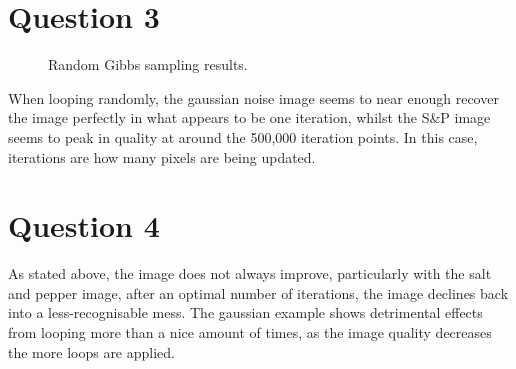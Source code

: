 \documentclass[]{article}
\begin{document}
    \section*{Question 3}
        \begin{figure}[h]
            \centering
            \caption{Random Gibbs sampling results.}
            \label{fig:q3}
        \end{figure}
        \par
        When looping randomly, the gaussian noise image seems to near enough recover the image perfectly
        in what appears to be one iteration, whilst the S\&P image seems to peak in quality at around
        the 500,000 iteration points. In this case, iterations are how many pixels are being updated.
    \section*{Question 4}
        \par
        As stated above, the image does not always improve, particularly with the salt and pepper image,
        after an optimal number of iterations, the image declines back into a less-recognisable mess. The
        gaussian example shows detrimental effects from looping more than a nice amount of times, as
        the image quality decreases the more loops are applied.
\end{document}
